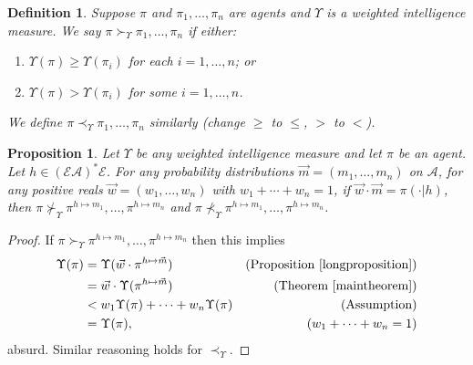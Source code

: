 \documentclass[twoside]{article}
\newtheorem{definition}[theorem]{Definition}
\newtheorem{proposition}[theorem]{Proposition}
\begin{document}

\begin{definition}
    Suppose $\pi$ and $\pi_1,\ldots,\pi_n$ are agents and $\Upsilon$ is a
    weighted intelligence measure.
    We say $\pi\succ_\Upsilon \pi_1,\ldots,\pi_n$
    if either:
    \begin{enumerate}
        \item $\Upsilon(\pi)\geq \Upsilon(\pi_i)$ for each $i=1,\ldots,n$; or
        \item $\Upsilon(\pi)>\Upsilon(\pi_i)$ for some $i=1,\ldots,n$.
    \end{enumerate}
    We define $\pi\prec_\Upsilon\pi_1,\ldots,\pi_n$ similarly (change $\geq$ to $\leq$,
    $>$ to $<$).
\end{definition}

\begin{proposition}
\label{pointwisegenericnessthm}
    Let $\Upsilon$ be any weighted intelligence measure and let
    $\pi$ be an agent.
    Let $h\in (\mathcal E\mathcal A)^*\mathcal E$.
    For any probability distributions $\vec m=(m_1,\ldots,m_n)$ on $\mathcal A$,
    for any positive reals $\vec w=(w_1,\ldots,w_n)$ with $w_1+\cdots+w_n=1$,
    if $\vec w\cdot\vec m=\pi(\cdot|h)$,
    then $\pi\not\succ_\Upsilon \pi^{h\mapsto m_1},\ldots,\pi^{h\mapsto m_n}$
    and $\pi\not\prec_\Upsilon \pi^{h\mapsto m_1},\ldots,\pi^{h\mapsto m_n}$.
\end{proposition}

\begin{proof}
    If $\pi\succ_\Upsilon\pi^{h\mapsto m_1},\ldots,\pi^{h\mapsto m_n}$
    then this implies
    \begin{align*}
        \Upsilon(\pi)
            &= \Upsilon(\vec w\cdot\pi^{h\mapsto\vec m})
                &\mbox{(Proposition \ref{longproposition})}\\
            &= \vec w\cdot\Upsilon(\pi^{h\mapsto\vec m})
                &\mbox{(Theorem \ref{maintheorem})}\\
            &< w_1\Upsilon(\pi)+\cdots+w_n\Upsilon(\pi)
                &\mbox{(Assumption)}\\
            &= \Upsilon(\pi),
                &\mbox{($w_1+\cdots+w_n=1$)}
    \end{align*}
    absurd. Similar reasoning holds for $\prec_\Upsilon$.
\end{proof}
\end{document}

